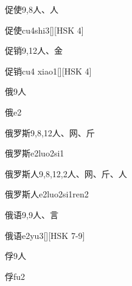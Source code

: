\begin{Entry}{促使}{9,8}{⼈、⼈}
  \begin{Phonetics}{促使}{cu4shi3}[][HSK 4]
  \end{Phonetics}
\end{Entry}

\begin{Entry}{促销}{9,12}{⼈、⾦}
  \begin{Phonetics}{促销}{cu4 xiao1}[][HSK 4]
  \end{Phonetics}
\end{Entry}

\begin{Entry}{俄}{9}{⼈}
  \begin{Phonetics}{俄}{e2}
  \end{Phonetics}
\end{Entry}

\begin{Entry}{俄罗斯}{9,8,12}{⼈、⽹、⽄}
  \begin{Phonetics}{俄罗斯}{e2luo2si1}
  \end{Phonetics}
\end{Entry}

\begin{Entry}{俄罗斯人}{9,8,12,2}{⼈、⽹、⽄、⼈}
  \begin{Phonetics}{俄罗斯人}{e2luo2si1ren2}
  \end{Phonetics}
\end{Entry}

\begin{Entry}{俄语}{9,9}{⼈、⾔}
  \begin{Phonetics}{俄语}{e2yu3}[][HSK 7-9]
  \end{Phonetics}
\end{Entry}

\begin{Entry}{俘}{9}{⼈}
  \begin{Phonetics}{俘}{fu2}
  \end{Phonetics}
\end{Entry}

